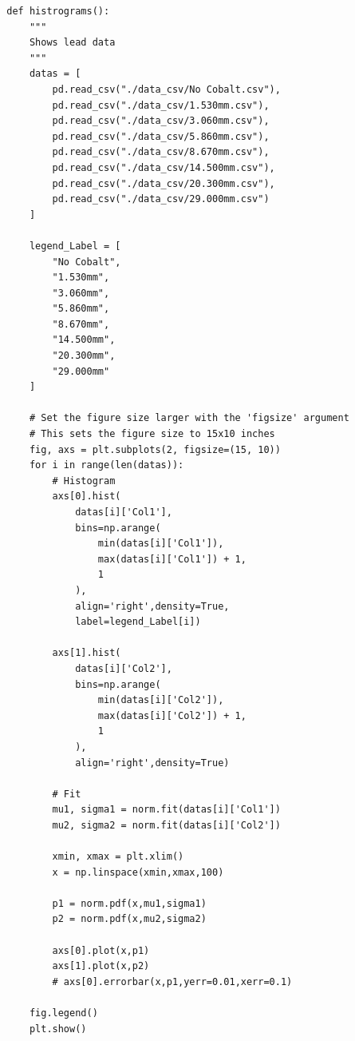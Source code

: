 \documentclass[12pt]{article}
\begin{document}
    \lstset{language=Python}
    \lstset{frame=lines}
    \lstset{basicstyle=\footnotesize}
    \begin{lstlisting}
        def histrograms():
            """
            Shows lead data
            """
            datas = [
                pd.read_csv("./data_csv/No Cobalt.csv"),
                pd.read_csv("./data_csv/1.530mm.csv"),
                pd.read_csv("./data_csv/3.060mm.csv"),
                pd.read_csv("./data_csv/5.860mm.csv"),
                pd.read_csv("./data_csv/8.670mm.csv"),
                pd.read_csv("./data_csv/14.500mm.csv"),
                pd.read_csv("./data_csv/20.300mm.csv"),
                pd.read_csv("./data_csv/29.000mm.csv")
            ]
        
            legend_Label = [
                "No Cobalt",
                "1.530mm",
                "3.060mm",
                "5.860mm",
                "8.670mm",
                "14.500mm",
                "20.300mm",
                "29.000mm"
            ]
        
            # Set the figure size larger with the 'figsize' argument
            # This sets the figure size to 15x10 inches
            fig, axs = plt.subplots(2, figsize=(15, 10))
            for i in range(len(datas)):
                # Histogram
                axs[0].hist(
                    datas[i]['Col1'],
                    bins=np.arange( 
                        min(datas[i]['Col1']), 
                        max(datas[i]['Col1']) + 1, 
                        1
                    ), 
                    align='right',density=True, 
                    label=legend_Label[i])
                
                axs[1].hist(
                    datas[i]['Col2'],
                    bins=np.arange(
                        min(datas[i]['Col2']), 
                        max(datas[i]['Col2']) + 1, 
                        1
                    ), 
                    align='right',density=True)
                
                # Fit
                mu1, sigma1 = norm.fit(datas[i]['Col1'])
                mu2, sigma2 = norm.fit(datas[i]['Col2'])
                
                xmin, xmax = plt.xlim()
                x = np.linspace(xmin,xmax,100)
                
                p1 = norm.pdf(x,mu1,sigma1)
                p2 = norm.pdf(x,mu2,sigma2)
                
                axs[0].plot(x,p1)
                axs[1].plot(x,p2)
                # axs[0].errorbar(x,p1,yerr=0.01,xerr=0.1)
        
            fig.legend()
            plt.show()
    
    \end{lstlisting}
\end{document}
